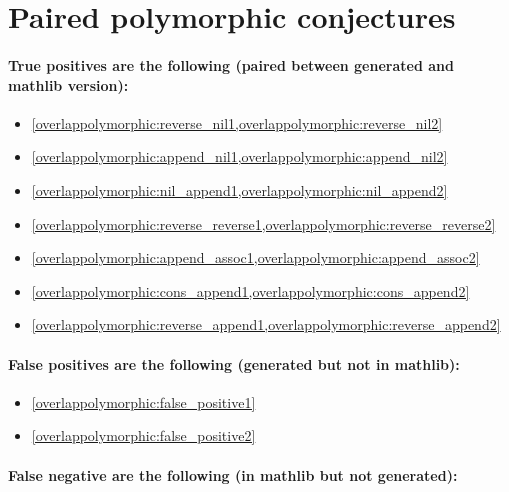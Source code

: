 \newpage
\section{Paired polymorphic conjectures}\label{app:overlappolymorphic}

\paragraph*{True positives are the following (paired between generated and mathlib version):}

\begin{multicols}{2}
\begin{itemize}[noitemsep]
    \item \cref{overlappolymorphic:reverse_nil1,overlappolymorphic:reverse_nil2}
    \item \cref{overlappolymorphic:append_nil1,overlappolymorphic:append_nil2}
    \item \cref{overlappolymorphic:nil_append1,overlappolymorphic:nil_append2}
    \item \cref{overlappolymorphic:reverse_reverse1,overlappolymorphic:reverse_reverse2}
    \item \cref{overlappolymorphic:append_assoc1,overlappolymorphic:append_assoc2}
    \item \cref{overlappolymorphic:cons_append1,overlappolymorphic:cons_append2}
    \item \cref{overlappolymorphic:reverse_append1,overlappolymorphic:reverse_append2}
\end{itemize}
\end{multicols}

\paragraph*{False positives are the following (generated but not in mathlib):}

\begin{multicols}{2}
\begin{itemize}[noitemsep]
    \item \cref{overlappolymorphic:false_positive1}
    \item \cref{overlappolymorphic:false_positive2}
\end{itemize}
\end{multicols}

\paragraph*{False negative are the following (in mathlib but not generated):}

